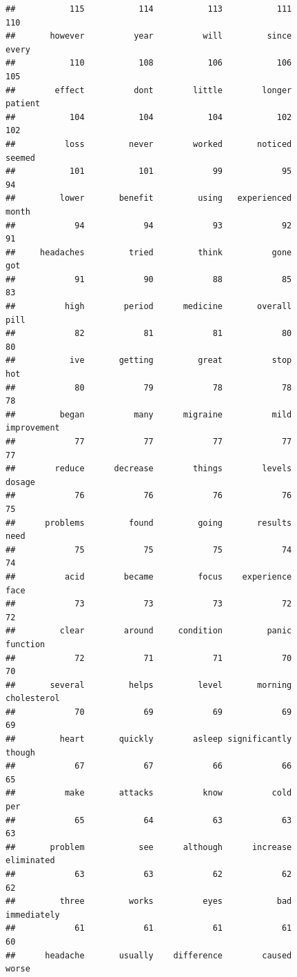 \documentclass[spanish,]{article}
\begin{document}
\begin{verbatim}
##           115           114           113           111           110 
##       however          year          will         since         every 
##           110           108           106           106           105 
##        effect          dont        little        longer       patient 
##           104           104           104           102           102 
##          loss         never        worked       noticed        seemed 
##           101           101            99            95            94 
##         lower       benefit         using   experienced         month 
##            94            94            93            92            91 
##     headaches         tried         think          gone           got 
##            91            90            88            85            83 
##          high        period      medicine       overall          pill 
##            82            81            81            80            80 
##           ive       getting         great          stop           hot 
##            80            79            78            78            78 
##         began          many      migraine          mild   improvement 
##            77            77            77            77            77 
##        reduce      decrease        things        levels        dosage 
##            76            76            76            76            75 
##      problems         found         going       results          need 
##            75            75            75            74            74 
##          acid        became         focus    experience          face 
##            73            73            73            72            72 
##         clear        around     condition         panic      function 
##            72            71            71            70            70 
##       several         helps         level       morning   cholesterol 
##            70            69            69            69            69 
##         heart       quickly        asleep significantly        though 
##            67            67            66            66            65 
##          make       attacks          know          cold           per 
##            65            64            63            63            63 
##       problem           see      although      increase    eliminated 
##            63            63            62            62            62 
##         three         works          eyes           bad   immediately 
##            61            61            61            61            60 
##      headache       usually    difference        caused         worse 

\end{verbatim}
\end{document}
